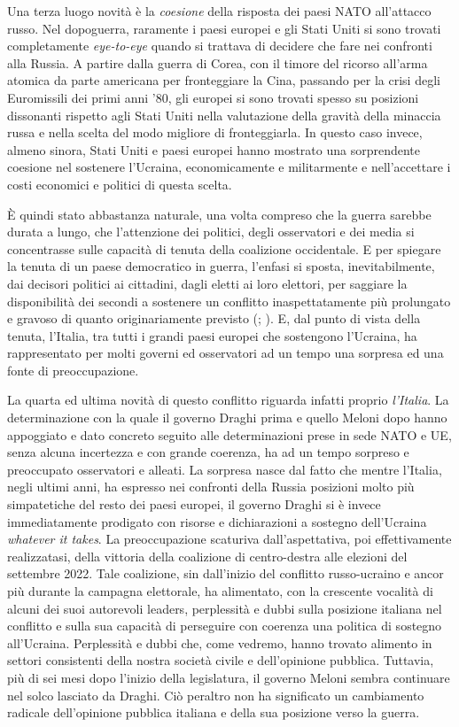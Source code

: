 \documentclass[
  openany]{book}
\begin{document}
Una terza luogo novità è la \emph{coesione} della risposta dei paesi NATO all'attacco russo. Nel dopoguerra, raramente i paesi europei e gli Stati Uniti si sono trovati completamente \emph{eye-to-eye} quando si trattava di decidere che fare nei confronti alla Russia. A partire dalla guerra di Corea, con il timore del ricorso all'arma atomica da parte americana per fronteggiare la Cina, passando per la crisi degli Euromissili dei primi anni '80, gli europei si sono trovati spesso su posizioni dissonanti rispetto agli Stati Uniti nella valutazione della gravità della minaccia russa e nella scelta del modo migliore di fronteggiarla. In questo caso invece, almeno sinora, Stati Uniti e paesi europei hanno mostrato una sorprendente coesione nel sostenere l'Ucraina, economicamente e militarmente e nell'accettare i costi economici e politici di questa scelta.

È quindi stato abbastanza naturale, una volta compreso che la guerra sarebbe durata a lungo, che l'attenzione dei politici, degli osservatori e dei media si concentrasse sulle capacità di tenuta della coalizione occidentale. E per spiegare la tenuta di un paese democratico in guerra, l'enfasi si sposta, inevitabilmente, dai decisori politici ai cittadini, dagli eletti ai loro elettori, per saggiare la disponibilità dei secondi a sostenere un conflitto inaspettatamente più prolungato e gravoso di quanto originariamente previsto (\citet{Mueller1971}; \citet{Aldrich-et-al2006}). E, dal punto di vista della tenuta, l'Italia, tra tutti i grandi paesi europei che sostengono l'Ucraina, ha rappresentato per molti governi ed osservatori ad un tempo una sorpresa ed una fonte di preoccupazione.

La quarta ed ultima novità di questo conflitto riguarda infatti proprio \emph{l'Italia}. La determinazione con la quale il governo Draghi prima e quello Meloni dopo hanno appoggiato e dato concreto seguito alle determinazioni prese in sede NATO e UE, senza alcuna incertezza e con grande coerenza, ha ad un tempo sorpreso e preoccupato osservatori e alleati. La sorpresa nasce dal fatto che mentre l'Italia, negli ultimi anni, ha espresso nei confronti della Russia posizioni molto più simpatetiche del resto dei paesi europei, il governo Draghi si è invece immediatamente prodigato con risorse e dichiarazioni a sostegno dell'Ucraina \emph{whatever it takes}. La preoccupazione scaturiva dall'aspettativa, poi effettivamente realizzatasi, della vittoria della coalizione di centro-destra alle elezioni del settembre 2022. Tale coalizione, sin dall'inizio del conflitto russo-ucraino e ancor più durante la campagna elettorale, ha alimentato, con la crescente vocalità di alcuni dei suoi autorevoli leaders, perplessità e dubbi sulla posizione italiana nel conflitto e sulla sua capacità di perseguire con coerenza una politica di sostegno all'Ucraina. Perplessità e dubbi che, come vedremo, hanno trovato alimento in settori consistenti della nostra società civile e dell'opinione pubblica. Tuttavia, più di sei mesi dopo l'inizio della legislatura, il governo Meloni sembra continuare nel solco lasciato da Draghi. Ciò peraltro non ha significato un cambiamento radicale dell'opinione pubblica italiana e della sua posizione verso la guerra.
\end{document}
